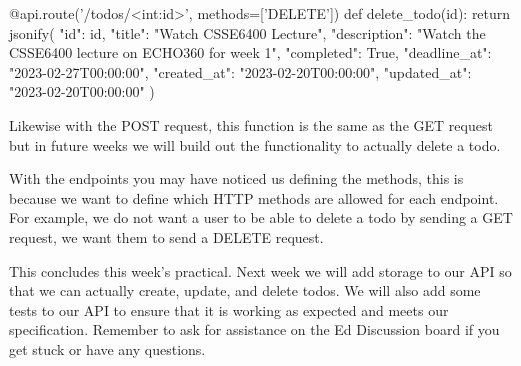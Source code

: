 \documentclass{csse4400}
\begin{document}
\begin{code}[language=python]{}
  @api.route('/todos/<int:id>', methods=['DELETE'])
  def delete_todo(id):
      return jsonify({
        "id": id,
        "title": "Watch CSSE6400 Lecture",
        "description": "Watch the CSSE6400 lecture on ECHO360 for week 1",
        "completed": True,
        "deadline_at": "2023-02-27T00:00:00",
        "created_at": "2023-02-20T00:00:00",
        "updated_at": "2023-02-20T00:00:00"
      })
\end{code}

Likewise with the POST request, this function is the same as the GET request but in future weeks we will build out the functionality to actually delete a todo.

With the endpoints you may have noticed us defining the methods, this is because we want to define which HTTP methods are allowed for each endpoint. For example, we do not want a user to be able to delete a todo by sending a GET request, we want them to send a DELETE request.

This concludes this week's practical.
Next week we will add storage to our API so that we can actually create, update, and delete todos.
We will also add some tests to our API to ensure that it is working as expected and meets our specification.
Remember to ask for assistance on the Ed Discussion board if you get stuck or have any questions.

%
%
\end{document}
